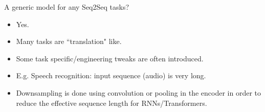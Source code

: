 %
%
%
%
%
%
%
%
%

\begin{frame}{A generic model for any Seq2Seq tasks?}
\begin{itemize}
\item Yes.
\item Many tasks are ``translation" like.
\item Some task specific/engineering tweaks are often introduced.
\item E.g. Speech recognition: input sequence (audio) is
very long.
\item Downsampling is done using convolution or pooling in the encoder
in order to reduce the effective sequence length for RNNs/Transformers.
\end{itemize}
\end{frame}


